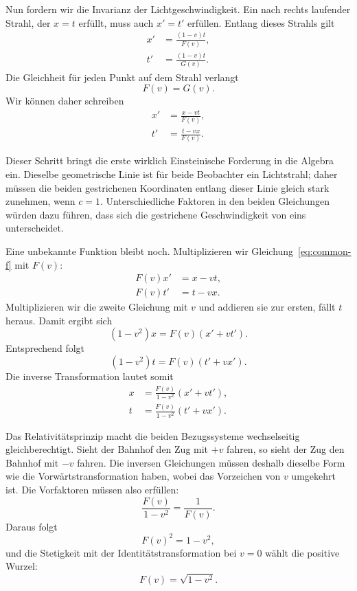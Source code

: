 Nun fordern wir die Invarianz der Lichtgeschwindigkeit. Ein nach rechts laufender Strahl, der \(x=t\) erfüllt, muss auch \(x'=t'\) erfüllen. Entlang dieses Strahls gilt
\begin{align}
x'&=\frac{(1-v)t}{F(v)},\\
t'&=\frac{(1-v)t}{G(v)}.
\end{align}
Die Gleichheit für jeden Punkt auf dem Strahl verlangt
\begin{equation}
F(v)=G(v).
\end{equation}
Wir können daher schreiben
\begin{align}
x'&=\frac{x-vt}{F(v)},\\
t'&=\frac{t-vx}{F(v)}.
\label{eq:common-f}
\end{align}

Dieser Schritt bringt die erste wirklich Einsteinische Forderung in die Algebra ein. Dieselbe geometrische Linie ist für beide Beobachter ein Lichtstrahl; daher müssen die beiden gestrichenen Koordinaten entlang dieser Linie gleich stark zunehmen, wenn \(c=1\). Unterschiedliche Faktoren in den beiden Gleichungen würden dazu führen, dass sich die gestrichene Geschwindigkeit von eins unterscheidet.

Eine unbekannte Funktion bleibt noch. Multiplizieren wir Gleichung~\eqref{eq:common-f} mit \(F(v)\):
\begin{align}
F(v)x'&=x-vt,\\
F(v)t'&=t-vx.
\end{align}
Multiplizieren wir die zweite Gleichung mit \(v\) und addieren sie zur ersten, fällt \(t\) heraus. Damit ergibt sich
\begin{equation}
(1-v^2)x=F(v)(x'+vt').
\end{equation}
Entsprechend folgt
\begin{equation}
(1-v^2)t=F(v)(t'+vx').
\end{equation}
Die inverse Transformation lautet somit
\begin{align}
x&=\frac{F(v)}{1-v^2}(x'+vt'),\\
t&=\frac{F(v)}{1-v^2}(t'+vx').
\end{align}

Das Relativitätsprinzip macht die beiden Bezugssysteme wechselseitig gleichberechtigt. Sieht der Bahnhof den Zug mit \(+v\) fahren, so sieht der Zug den Bahnhof mit \(-v\) fahren. Die inversen Gleichungen müssen deshalb dieselbe Form wie die Vorwärtstransformation haben, wobei das Vorzeichen von \(v\) umgekehrt ist. Die Vorfaktoren müssen also erfüllen:
\begin{equation}
\frac{F(v)}{1-v^2}=\frac{1}{F(v)}.
\end{equation}
Daraus folgt
\begin{equation}
F(v)^2=1-v^2,
\end{equation}
und die Stetigkeit mit der Identitätstransformation bei \(v=0\) wählt die positive Wurzel:
\begin{equation}
F(v)=\sqrt{1-v^2}.
\end{equation}

